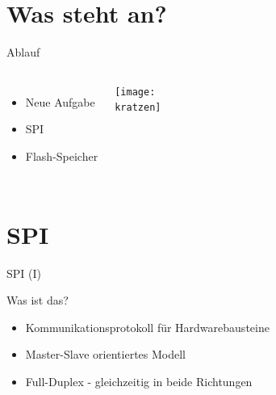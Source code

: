   \section{Was steht an?}
  \begin{frame}{Ablauf}
    \begin{columns}
      \begin{itemize}
        \item Neue Aufgabe
        \item SPI
        \item Flash-Speicher
      \end{itemize}
      \texttt{[image: \\kratzen]}
    \end{columns}
  \end{frame}




  \section{SPI}

  \begin{frame} {SPI (I)}
    \begin{block} {Was ist das?}
      \begin{itemize}
        \item Kommunikationsprotokoll für Hardwarebausteine
        \item Master-Slave orientiertes Modell
        \item Full-Duplex - gleichzeitig in beide Richtungen
      \end{itemize}
    \end{block}
  \end{frame}


